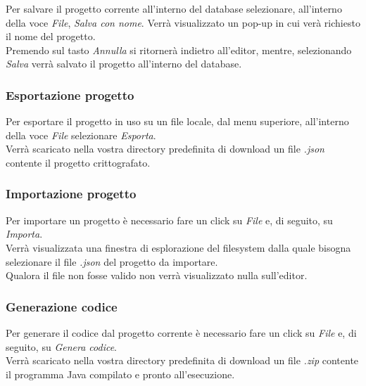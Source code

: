 			Per salvare il progetto corrente all'interno del database selezionare, all'interno della voce \emph{File}, \emph{Salva con nome}.
			Verrà visualizzato un pop-up in cui verà richiesto il nome del progetto.\\
			Premendo sul tasto \emph{Annulla} si ritornerà indietro all'editor, mentre, selezionando \emph{Salva} verrà salvato il progetto all'interno del database.
		\subsubsection{Esportazione progetto}
			Per esportare il progetto in uso su un file locale, dal menu superiore, all'interno della voce \textit{File} selezionare \textit{Esporta}.\\
			Verrà scaricato nella vostra directory predefinita di download un file \emph{.json} contente il progetto crittografato.\\
		\subsubsection{Importazione progetto}
			Per importare un progetto è necessario fare un click su \textit{File} e, di seguito, su \emph{Importa}.\\
			Verrà visualizzata una finestra di esplorazione del filesystem dalla quale bisogna selezionare il file \emph{.json} del progetto da importare.\\
			Qualora il file non fosse valido non verrà visualizzato nulla sull'editor.\\
		\subsubsection{Generazione codice}
			Per generare il codice dal progetto corrente è necessario fare un click su \textit{File} e, di seguito, su \emph{Genera codice}.\\
			Verrà scaricato nella vostra directory predefinita di download un file \emph{.zip} contente il programma Java compilato e pronto all'esecuzione.\\
